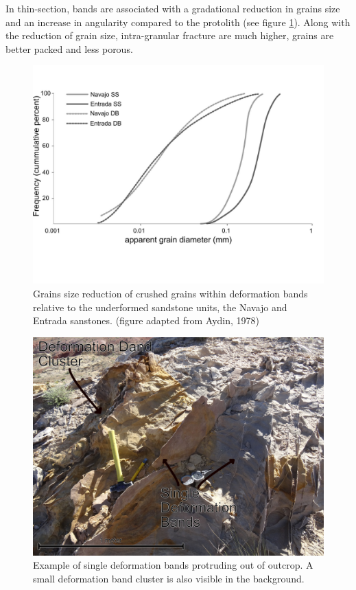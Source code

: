 \documentclass[12pt,a4paper]{article}
\begin{document}
In thin-section, bands are associated with a gradational reduction in grains size and an increase in angularity compared to the protolith (see figure \ref{grain_size}). Along with the reduction of grain size, intra-granular fracture are much higher, grains are better packed and less porous. 

\begin{figure}[h]
	\centering

		\includegraphics[width=\textwidth]{Grain_size_distribution}

	\caption{Grains size reduction of crushed grains within deformation bands relative to the underformed sandstone units, the Navajo and Entrada sanstones. (figure adapted from Aydin, 1978)}
	\label{grain_size}
\end{figure} 


\begin{figure}[h]
	\centering

		\includegraphics[width=\textwidth]{Defomation_Bands}

	\caption{Example of single deformation bands protruding out of outcrop. A small deformation band cluster is also visible in the background.}
	\label{deformation_band}
\end{figure} 
\end{document}
